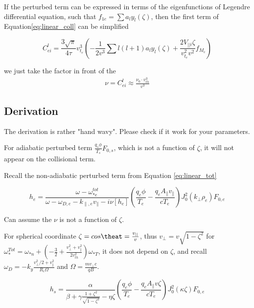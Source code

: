 If the perturbed term can be expressed in terms of the eigenfunctions of Legendre differential equation, such that $f_{1e}=\sum a_ly_l(\zeta)$, then the first term of Equation\ref{eq:linear_coll} can be simplified

\begin{equation}
C_{e i}^{l}=\frac{3 \sqrt{\pi}}{4 \tau} v_{t_{e}}^{3}\left(-\frac{1}{2 v^{3}} 
\sum l(l+1)a_ly_l(\zeta)
+\frac{2 V_{|| i} \zeta}{v_{t_{e}}^{2} v^{2}} f_{M_{e}}\right)
\end{equation}

we just take the factor in front of the 
\begin{eqnarray}
     \nu=C_{e i}^{l}\approx \frac{\nu_0\cdot v_{th}^3}{v^3}
\end{eqnarray}

\subsection{Derivation}

The derivation is rather "hand wavy". Please check if it work for your parameters. 

For adiabatic perturbed term $\frac{q_s\phi}{T_s}F_{0,s}$, which is not a function of $\zeta$, it will not appear on the collisional term. 

Recall the non-adiabatic perturbed term from Equation \ref{eq:linear_tot}

\begin{equation}
h_{e}=\frac{\omega-\omega_{* e}^{t o t}}{\omega-\omega_{D, e}-k_{ \|, e} v_{ \|}-i \nu\left[h_{e}\right]}\left(\frac{q_{e} \phi}{T_{e}}-\frac{q_{e} A_{ \|} v_{ \|}}{c T_{e}}\right) J_{0}^{2}\left(k_{\perp} \rho_{e}\right) F_{0, e}
\end{equation}

Can assume the $\nu$ is not a function of $\zeta$. 

For spherical coordinate $\zeta =cos\theat =\frac{v_{||}}{v}$, thus $v_\perp=v\sqrt{1-\zeta^2}$ for $\omega_{*}^{T o t}=\omega_{* n}+\left(-\frac{3}{2}+\frac{v_{\perp}^{2}+v_{ \|}^{2}}{2 v_{t h}^{2}}\right) \omega_{* T}$, it does not depend on $\zeta$, and recall $\omega_D=-k_{y} \frac{v_{\perp}^{2} / 2+v_{ \|}^{2}}{R_{c} \Omega}$ and $\Omega=\frac{m v_\perp c}{q B}$. 

\begin{equation}
h_{s}=\frac{\alpha}{\beta+
\gamma
 \frac{1+\zeta^2}{\sqrt{1-\zeta^2}}
-\eta\zeta}
\left(\frac{q_{e} \phi}{T_{e}}-\frac{q_{e} A_{ \|} v\zeta}{c T_{e}}\right) J_{0}^{2}\left(\kappa \zeta \right) F_{0, e}
\end{equation}


